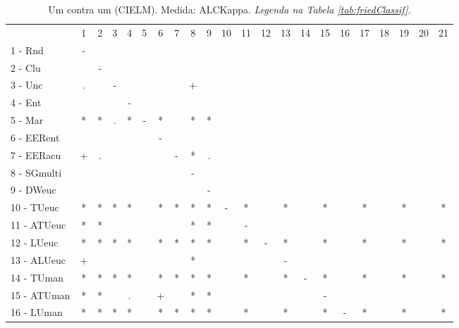 \begin{table}[h]
\caption{Um contra um (CIELM). Medida: ALCKappa. \textit{Legenda na Tabela \ref{tab:friedClassif}.}}
\begin{center}\begin{tabular}{lcc|cc|cc|cc|cc|cc|cc|cc|cc|cc|c}
 			& 1 & 2 & 3 & 4 & 5 & 6 & 7 & 8 & 9 & 10 & 11 & 12 & 13 & 14 & 15 & 16 & 17 & 18 & 19 & 20 & 21\\
1 - Rnd  	& - &   &   &   &   &   &   &   &   &   &   &   &   &   &   &   &   &   &   &   &   \\
2 - Clu  	&   & - &   &   &   &   &   &   &   &   &   &   &   &   &   &   &   &   &   &   &   \\ \hline
3 - Unc  	& . &   & - &   &   &   &   & + &   &   &   &   &   &   &   &   &   &   &   &   &   \\
4 - Ent  	&   &   &   & - &   &   &   &   &   &   &   &   &   &   &   &   &   &   &   &   &   \\ \hline
5 - Mar  	& * & * & . & * & - & * &   & * & * &   &   &   &   &   &   &   &   &   &   &   &   \\
6 - EERent	&   &   &   &   &   & - &   &   &   &   &   &   &   &   &   &   &   &   &   &   &   \\ \hline
7 - EERacu	& + & . &   &   &   &   & - & * & . &   &   &   &   &   &   &   &   &   &   &   &   \\
8 - SGmulti	&   &   &   &   &   &   &   & - &   &   &   &   &   &   &   &   &   &   &   &   &   \\ \hline
9 - DWeuc	&   &   &   &   &   &   &   &   & - &   &   &   &   &   &   &   &   &   &   &   &   \\
10 - TUeuc	& * & * & * & * &   & * & * & * & * & - & * &   & * &   & * &   & * &   & * &   & * \\ \hline
11 - ATUeuc	& * & * &   &   &   &   &   & * & * &   & - &   &   &   &   &   &   &   &   &   &   \\
12 - LUeuc	& * & * & * & * &   & * & * & * & * &   & * & - & * &   & * &   & * &   & * &   & * \\ \hline
13 - ALUeuc	& + &   &   &   &   &   &   & * &   &   &   &   & - &   &   &   &   &   &   &   &   \\
14 - TUman	& * & * & * & * &   & * & * & * & * &   & * &   & * & - & * &   & * &   & * &   & * \\ \hline
15 - ATUman	& * & * &   & . &   & + &   & * & * &   &   &   &   &   & - &   &   &   &   &   &   \\
16 - LUman	& * & * & * & * &   & * & * & * & * &   & * &   & * &   & * & - & * &   & * &   & * \\ \hline

\end{tabular}
\end{center}
\end{table}
